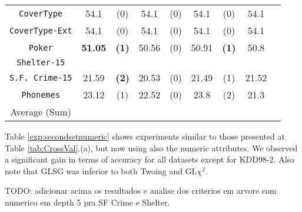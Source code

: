 \begin{table*}
\begin{tabular}{c|cc|cc|cc|cc}
{\tt CoverType}    &54.1        & (0)       & 54.1        & (0)       & 54.1        & (0)       & 54.1        &           \\
{\tt CoverType-Ext}&54.1        & (0)       & 54.1        & (0)       & 54.1        & (0)       & 54.1        &           \\
{\tt Poker}        &{\bf 51.05} & {\bf (1)} & 50.56       & (0)       & 50.91       & {\bf (1)} & 50.8        &           \\  
{\tt Shelter-15}   &            &           &             &           &             &           &             &           \\   
{\tt S.F. Crime-15}& 21.59      & {\bf (2)} & 20.53       & (0)       & 21.49       & (1)       & 21.52       &           \\ 
{\tt Phonemes}     & 23.12      & (1)       & 22.52       & (0)       & 23.8        & (2)       & 21.3        &           \\ 
\hline
Average (Sum)      &            &           &             &           &             &           &             & 
       \end{tabular}
\end{table*}


Table \ref{exp:secondsetnumeric} shows experiments  similar to those presented at Table \ref{tab:CrossVal}.(a), but now
using also the numeric attributes. We observed a significant gain in terms of accuracy for all datasets except for KDD98-2. 
Also note that GLSG was inferior to both Twoing and GL$\chi^2$.

TODO: adicionar acima os resultados e analise dos criterios em arvore com numerico em depth 5 pra SF Crime e Shelter.

